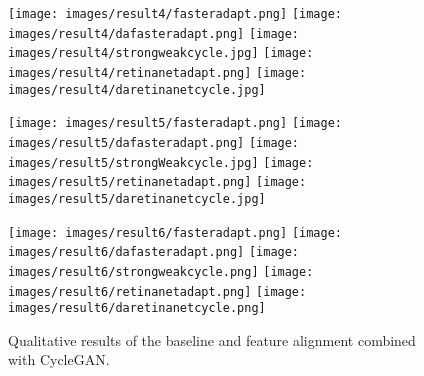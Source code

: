 \documentclass[preprint]{elsarticle}
\begin{document}
\begin{figure*}[t!]
            \vspace{1mm}
            \texttt{[image: images/result4/fasteradapt.png]}
            \texttt{[image: images/result4/dafasteradapt.png]}
            \texttt{[image: images/result4/strongweakcycle.jpg]}
            \texttt{[image: images/result4/retinanetadapt.png]}
            \texttt{[image: images/result4/daretinanetcycle.jpg]}
            
            \vspace{1mm}
            \texttt{[image: images/result5/fasteradapt.png]}
            \texttt{[image: images/result5/dafasteradapt.png]}
            \texttt{[image: images/result5/strongWeakcycle.jpg]}
            \texttt{[image: images/result5/retinanetadapt.png]}
            \texttt{[image: images/result5/daretinanetcycle.jpg]}
            
            \vspace{1mm}
            \texttt{[image: images/result6/fasteradapt.png]}
            \texttt{[image: images/result6/dafasteradapt.png]}
            \texttt{[image: images/result6/strongweakcycle.png]}
            \texttt{[image: images/result6/retinanetadapt.png]}
            \texttt{[image: images/result6/daretinanetcycle.png]}

            \caption{Qualitative results of the baseline and feature alignment combined with CycleGAN.}
            \label{fig:qualitativeresult2}
\end{figure*}
\end{document}
